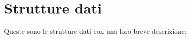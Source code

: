\section{Strutture dati}
Queste sono le strutture dati con una loro breve descrizione\+:\begin{DoxyCompactList}
\item{}
\item{}
\end{DoxyCompactList}
